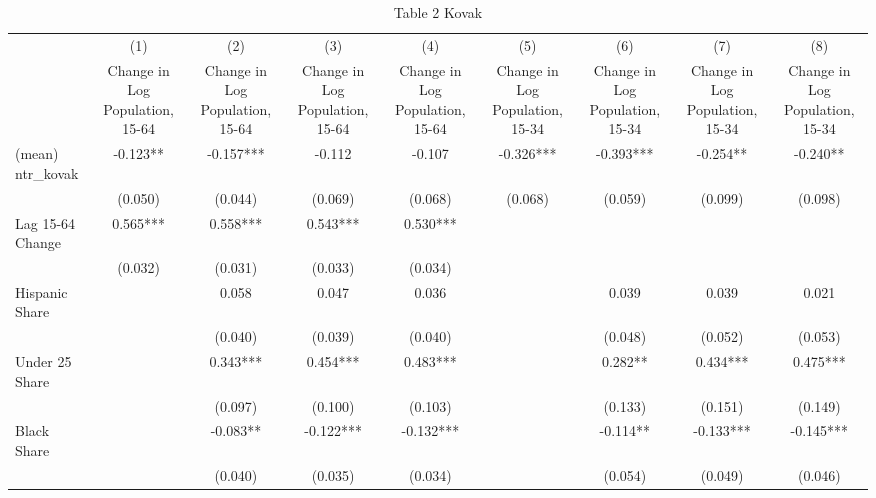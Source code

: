 \begin{table}[htbp]\centering
\def\sym#1{\ifmmode^{#1}\else\(^{#1}\)\fi}
\caption{Table 2 Kovak}
\begin{tabular}{l*{8}{c}}
\toprule
                    &\multicolumn{1}{c}{(1)}&\multicolumn{1}{c}{(2)}&\multicolumn{1}{c}{(3)}&\multicolumn{1}{c}{(4)}&\multicolumn{1}{c}{(5)}&\multicolumn{1}{c}{(6)}&\multicolumn{1}{c}{(7)}&\multicolumn{1}{c}{(8)}\\
                    &\multicolumn{1}{c}{Change in Log Population, 15-64}&\multicolumn{1}{c}{Change in Log Population, 15-64}&\multicolumn{1}{c}{Change in Log Population, 15-64}&\multicolumn{1}{c}{Change in Log Population, 15-64}&\multicolumn{1}{c}{Change in Log Population, 15-34}&\multicolumn{1}{c}{Change in Log Population, 15-34}&\multicolumn{1}{c}{Change in Log Population, 15-34}&\multicolumn{1}{c}{Change in Log Population, 15-34}\\
\midrule
(mean) ntr\_kovak    &   -0.123** &   -0.157***&   -0.112   &   -0.107   &   -0.326***&   -0.393***&   -0.254** &   -0.240** \\
                    &  (0.050)   &  (0.044)   &  (0.069)   &  (0.068)   &  (0.068)   &  (0.059)   &  (0.099)   &  (0.098)   \\
\addlinespace
Lag 15-64 Change    &    0.565***&    0.558***&    0.543***&    0.530***&            &            &            &            \\
                    &  (0.032)   &  (0.031)   &  (0.033)   &  (0.034)   &            &            &            &            \\
\addlinespace
Hispanic Share      &            &    0.058   &    0.047   &    0.036   &            &    0.039   &    0.039   &    0.021   \\
                    &            &  (0.040)   &  (0.039)   &  (0.040)   &            &  (0.048)   &  (0.052)   &  (0.053)   \\
\addlinespace
Under 25 Share      &            &    0.343***&    0.454***&    0.483***&            &    0.282** &    0.434***&    0.475***\\
                    &            &  (0.097)   &  (0.100)   &  (0.103)   &            &  (0.133)   &  (0.151)   &  (0.149)   \\
\addlinespace
Black Share         &            &   -0.083** &   -0.122***&   -0.132***&            &   -0.114** &   -0.133***&   -0.145***\\
                    &            &  (0.040)   &  (0.035)   &  (0.034)   &            &  (0.054)   &  (0.049)   &  (0.046)   \\

\end{tabular}
\end{table}
